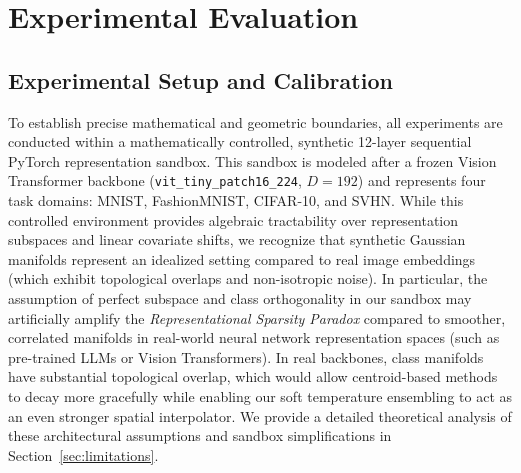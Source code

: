 \section{Experimental Evaluation}
\label{sec:experiments}
\subsection{Experimental Setup and Calibration}
To establish precise mathematical and geometric boundaries, all experiments are conducted within a mathematically controlled, synthetic 12-layer sequential PyTorch representation sandbox. This sandbox is modeled after a frozen Vision Transformer backbone (\texttt{vit\_tiny\_patch16\_224}, $D=192$) and represents four task domains: MNIST, FashionMNIST, CIFAR-10, and SVHN. While this controlled environment provides algebraic tractability over representation subspaces and linear covariate shifts, we recognize that synthetic Gaussian manifolds represent an idealized setting compared to real image embeddings (which exhibit topological overlaps and non-isotropic noise). In particular, the assumption of perfect subspace and class orthogonality in our sandbox may artificially amplify the \emph{Representational Sparsity Paradox} compared to smoother, correlated manifolds in real-world neural network representation spaces (such as pre-trained LLMs or Vision Transformers). In real backbones, class manifolds have substantial topological overlap, which would allow centroid-based methods to decay more gracefully while enabling our soft temperature ensembling to act as an even stronger spatial interpolator. We provide a detailed theoretical analysis of these architectural assumptions and sandbox simplifications in Section~\ref{sec:limitations}.
